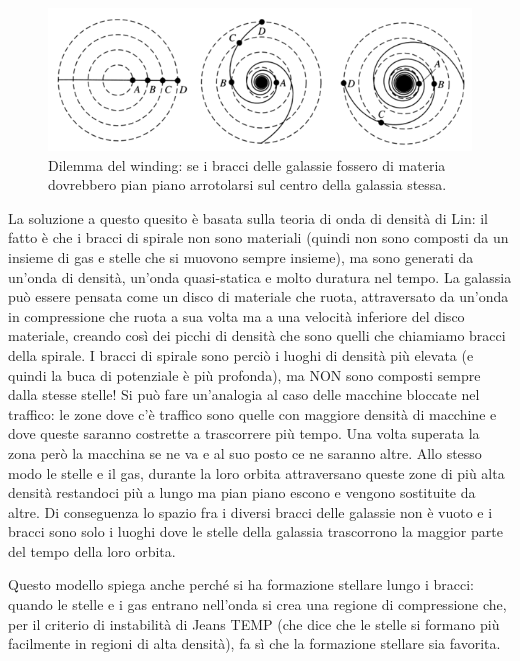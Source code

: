 \begin{figure}
    \centering
    \includegraphics{immagini/winding-dilemma.png}
    \caption[width =\textwidth]{Dilemma del winding: se i bracci delle galassie fossero di materia dovrebbero pian piano arrotolarsi sul centro della galassia stessa.}
    \label{fig:winding-dilemma}
\end{figure}

La soluzione a questo quesito è basata sulla teoria di onda di densità di Lin: il fatto è che i bracci di spirale non sono materiali (quindi non sono composti da un insieme di gas e stelle che si muovono sempre insieme), ma sono generati da un’onda di densità, un’onda quasi-statica e molto duratura nel tempo. La galassia può essere pensata come un disco di materiale che ruota, attraversato da un’onda in compressione che ruota a sua volta ma a una velocità inferiore del disco materiale, creando così dei picchi di densità che sono quelli che chiamiamo bracci della spirale. I bracci di spirale sono perciò i luoghi di densità più elevata (e quindi la buca di potenziale è più profonda), ma NON sono composti sempre dalla stesse stelle! Si può fare un'analogia al caso delle macchine bloccate nel traffico: le zone dove c'è traffico sono quelle con maggiore densità di macchine e dove queste saranno costrette a trascorrere più tempo. Una volta superata la zona però la macchina se ne va e al suo posto ce ne saranno altre. Allo stesso modo le stelle e il gas, durante la loro orbita attraversano queste zone di più alta densità restandoci più a lungo ma pian piano escono e vengono sostituite da altre. Di conseguenza lo spazio fra i diversi bracci delle galassie non è vuoto e i bracci sono solo i luoghi dove le stelle della galassia trascorrono la maggior parte del tempo della loro orbita.

Questo modello spiega anche perché si ha formazione stellare lungo i bracci: quando le stelle e i gas entrano nell’onda si crea una regione di compressione che, per il criterio di instabilità di Jeans TEMP (che dice che le stelle si formano più facilmente in regioni di alta densità), fa sì che la formazione stellare sia favorita.

